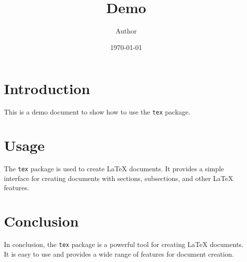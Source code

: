 \documentclass{article}
\begin{document}
\title{Demo}
\author{Author}
\date{\today}
\maketitle
\section{Introduction}
This is a demo document to show how to use the \texttt{tex} package.
\section{Usage}
The \texttt{tex} package is used to create LaTeX documents. It provides a simple interface for creating documents with sections, subsections, and other LaTeX features.
\section{Conclusion}
In conclusion, the \texttt{tex} package is a powerful tool for creating LaTeX documents. It is easy to use and provides a wide range of features for document creation.
\end{document}
